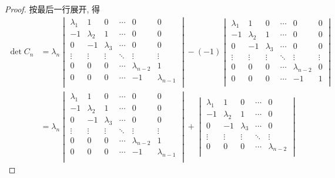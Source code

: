 \documentclass{ctexart}
\begin{document}
\begin{proof}
    按最后一行展开, 得
    \begin{align*}
        \det C_n & =\lambda_n\begin{vmatrix}
        \lambda_1 & 1 & 0 & \cdots & 0 & 0 \\
        -1 & \lambda_2 & 1 & \cdots & 0 & 0 \\
        0 & -1 & \lambda_3 & \cdots & 0 & 0 \\
        \vdots & \vdots & \vdots & \ddots & \vdots & \vdots \\
        0 & 0 & 0 & \cdots & \lambda_{n-2} & 1 \\
        0 & 0 & 0 & \cdots & -1 & \lambda_{n-1} \\
    \end{vmatrix}-(-1)\begin{vmatrix}
        \lambda_1 & 1 & 0 & \cdots & 0 & 0 \\
        -1 & \lambda_2 & 1 & \cdots & 0 & 0 \\
        0 & -1 & \lambda_3 & \cdots & 0 & 0 \\
        \vdots & \vdots & \vdots & \ddots & \vdots & \vdots \\
        0 & 0 & 0 & \cdots & \lambda_{n-2} & 0 \\
        0 & 0 & 0 & \cdots & -1 & 1 \\
    \end{vmatrix} \\
        & =\lambda_n\begin{vmatrix}
        \lambda_1 & 1 & 0 & \cdots & 0 & 0 \\
        -1 & \lambda_2 & 1 & \cdots & 0 & 0 \\
        0 & -1 & \lambda_3 & \cdots & 0 & 0 \\
        \vdots & \vdots & \vdots & \ddots & \vdots & \vdots \\
        0 & 0 & 0 & \cdots & \lambda_{n-2} & 1 \\
        0 & 0 & 0 & \cdots & -1 & \lambda_{n-1} \\
    \end{vmatrix}+\begin{vmatrix}
        \lambda_1 & 1 & 0 & \cdots & 0 \\
        -1 & \lambda_2 & 1 & \cdots & 0 \\
        0 & -1 & \lambda_3 & \cdots & 0 \\
        \vdots & \vdots & \vdots & \ddots & \vdots \\
        0 & 0 & 0 & \cdots & \lambda_{n-2} \\

\end{vmatrix}
\end{align*}
\end{proof}
\end{document}
